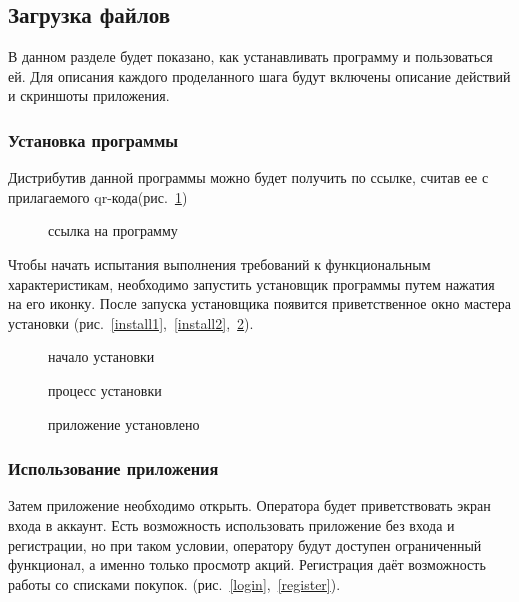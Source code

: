 \subsection{Загрузка файлов}
В данном разделе будет показано, как устанавливать программу и пользоваться ей. Для описания каждого проделанного шага будут включены описание действий и скриншоты приложения.
\subsubsection{Установка программы}
Дистрибутив данной программы можно будет получить по ссылке, считав ее с
прилагаемого qr-кода(рис.~\ref{ref})

\begin{figure}[h!]
    \centering
    \caption{ссылка на программу}
    \label{ref}
\end{figure}

Чтобы начать испытания выполнения требований к функциональным характеристикам,
необходимо запустить установщик программы путем нажатия на его иконку. После
запуска установщика появится приветственное окно мастера установки (рис.~\ref{install1},~\ref{install2},~\ref{install3}).

\begin{figure}[h!]
    \centering
    \caption{\small{начало установки}}
    \label{install1}
    \endminipage\hfill
    \caption{\small{процесс установки}}
    \label{install2}
    \endminipage\hfill
    \caption{\small{приложение установлено}}
    \label{install3}
    \endminipage{}
\end{figure}


\subsubsection{Использование приложения}
Затем приложение необходимо открыть. Оператора будет приветствовать экран входа
в аккаунт. Есть возможность использовать приложение без входа и регистрации, но
при таком условии, оператору будут доступен ограниченный функционал, а именно
только просмотр акций. Регистрация даёт возможность работы со списками покупок.
(рис.~\ref{login},~\ref{register}).

